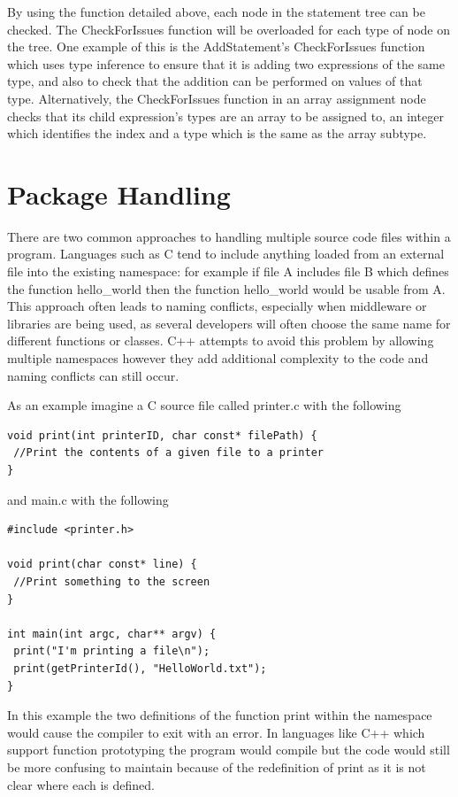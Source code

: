 \documentclass[]{final_report}
\begin{document}
By using the function detailed above, each node in the statement tree can be checked. The CheckForIssues function will be overloaded for each type of node on the tree. One example of this is the AddStatement's CheckForIssues function which uses type inference to ensure that it is adding two expressions of the same type, and also to check that the addition can be performed on values of that type. Alternatively, the CheckForIssues function in an array assignment node checks that its child expression's types are an array to be assigned to, an integer which identifies the index and a type which is the same as the array subtype.

\chapter{Package Handling}

There are two common approaches to handling multiple source code files within a program. Languages such as C tend to include anything loaded from an external file into the existing namespace: for example if file A includes file B which defines the function hello\_world then the function hello\_world would be usable from A. This approach often leads to naming conflicts, especially when middleware or libraries are being used, as several developers will often choose the same name for different functions or classes. C++ attempts to avoid this problem by allowing multiple namespaces however they add additional complexity to the code and naming conflicts can still occur.

As an example imagine a C source file called printer.c with the following

\begin{verbatim}
void print(int printerID, char const* filePath) {
 //Print the contents of a given file to a printer
}
\end{verbatim}

and main.c with the following
\begin{verbatim}
#include <printer.h>

void print(char const* line) {
 //Print something to the screen
}

int main(int argc, char** argv) {
 print("I'm printing a file\n");
 print(getPrinterId(), "HelloWorld.txt");
}
\end{verbatim}

In this example the two definitions of the function print within the namespace would cause the compiler to exit with an error. In languages like C++ which support function prototyping the program would compile but the code would still be more confusing to maintain because of the redefinition of print as it is not clear where each is defined.
\end{document}
